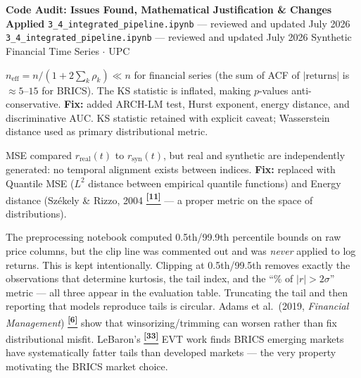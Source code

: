 \documentclass[10pt]{article}
\newcommand{\pagehead}[2]{%
  \begin{tcolorbox}[enhanced,arc=0pt,outer arc=0pt,boxrule=0pt,
    colback=Navy,colframe=Navy,
    top=5pt,bottom=5pt,left=8pt,right=8pt,
    before skip=0pt,after skip=10pt]
  {\color{white}\large\bfseries #1}%
  \ifx\relax#2\relax\else\\[1pt]{\color{blue!30!white}\small #2}\fi
  \hfill{\color{blue!20!white}\footnotesize Synthetic Financial Time Series $\cdot$ UPC}
  \end{tcolorbox}}
\newcommand{\tcite}[1]{%
  \hyperlink{R:#1}{\textsuperscript{\scriptsize\textbf{[#1]}}}}
\begin{document}
\clearpage

\pagehead{Code Audit: Issues Found, Mathematical Justification \& Changes Applied}
         {\texttt{3\_4\_integrated\_pipeline.ipynb} --- reviewed and updated July 2026}

\vspace{4pt}
\newcommand{\auditrow}[5]{%
  \begin{tcolorbox}[mybox={#2}{#3},
    title={\textbf{[#1]}\quad #4},
    before skip=4pt, after skip=4pt, breakable]
  \small #5
  \end{tcolorbox}}

\auditrow{FIXED}{DRed}{RBg}%
  {KS / Welch tests assumed i.i.d.\ --- CRITICAL}%
  {$n_\text{eff} = n/(1+2\sum_k\rho_k) \ll n$ for financial series (the sum of ACF of $|\text{returns}|$ is $\approx 5$--$15$ for BRICS). The KS statistic is inflated, making $p$-values anti-conservative. \textbf{Fix:} added ARCH-LM test, Hurst exponent, energy distance, and discriminative AUC. KS statistic retained with explicit caveat; Wasserstein distance used as primary distributional metric.}

\auditrow{FIXED}{DRed}{RBg}%
  {Pointwise MSE/MAE had no semantic meaning}%
  {MSE compared $r_\text{real}(t)$ to $r_\text{syn}(t)$, but real and synthetic are independently generated: no temporal alignment exists between indices. \textbf{Fix:} replaced with Quantile MSE ($L^2$ distance between empirical quantile functions) and Energy distance (Sz\'{e}kely \& Rizzo, 2004\tcite{11} --- a proper metric on the space of distributions).}

\auditrow{DECISION}{Indigo}{IBg}%
  {No outlier clipping applied to log returns --- deliberate methodological choice}%
  {The preprocessing notebook computed 0.5th/99.9th percentile bounds on raw price columns, but the clip line was commented out and was \emph{never} applied to log returns. This is kept intentionally. Clipping at 0.5th/99.5th removes exactly the observations that determine kurtosis, the tail index, and the ``\% of $|r|>2\sigma$'' metric --- all three appear in the evaluation table. Truncating the tail and then reporting that models reproduce tails is circular. Adams et al.\ (2019, \textit{Financial Management})\tcite{6} show that winsorizing/trimming can worsen rather than fix distributional misfit. LeBaron's\tcite{33} EVT work finds BRICS emerging markets have systematically fatter tails than developed markets --- the very property motivating the BRICS market choice.}
\end{document}
